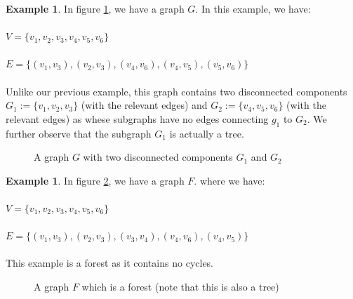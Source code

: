 \documentclass[11pt,reqno]{amsart}
\theoremstyle{definition}
\newtheorem{example}[thm]{Example}
\numberwithin{equation}{section}
\begin{document}
\begin{example}
	In figure \ref{fig:Disconnected}, we have a graph $G$. In this example, we have:\\ \\$V=\{v_1,v_2,v_3,v_4,v_5, v_6\}$
	\\
	\\$E=\{ (v_1, v_3) , (v_2, v_3), (v_4,v_6),(v_4,v_5),(v_5,v_6)\}$\\
	\\
	Unlike our previous example, this graph contains two disconnected components $G_1:=\{v_1,v_2,v_3\}$ (with the relevant edges) and $G_2:=\{v_4, v_5, v_6\}$ (with the relevant edges) as whese subgraphs have no edges connecting $g_1$ to $G_2$. We further observe that the subgraph $G_1$ is actually a tree.
	\begin{figure}[h!]
			\caption{A graph $G$ with two disconnected components $G_1$ and $G_2$}
			\label{fig:Disconnected}
		\end{figure}
\end{example}


\begin{example}
	In figure \ref{fig:Forest}, we have a graph $F$. where we have:\\ \\$V=\{v_1,v_2,v_3,v_4,v_5, v_6\}$
	\\
	\\$E=\{ (v_1, v_3) , (v_2, v_3), (v_3,v_4), (v_4,v_6),(v_4,v_5)\}$\\
	\\
	This example is a forest as it contains no cycles.
	\begin{figure}[h!]
		\caption{A graph $F$ which is a forest (note that this is also a tree)}
		\label{fig:Forest}
	\end{figure}
\end{example}
\end{document}
